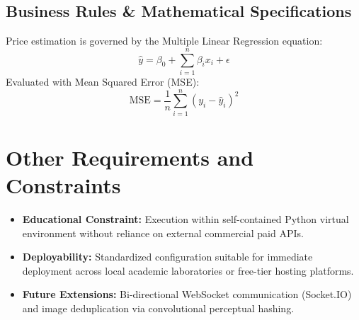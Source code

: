 \documentclass[11pt,a4paper]{article}
\begin{document}
\subsection{Business Rules \& Mathematical Specifications}
Price estimation is governed by the Multiple Linear Regression equation:
$$\hat{y} = \beta_0 + \sum_{i=1}^{n} \beta_i x_i + \epsilon$$
Evaluated with Mean Squared Error (MSE):
$$\text{MSE} = \frac{1}{n} \sum_{i=1}^{n} (y_i - \hat{y}_i)^2$$

\section{Other Requirements and Constraints}
\begin{itemize}[leftmargin=0.8cm]
    \item \textbf{Educational Constraint:} Execution within self-contained Python virtual environment without reliance on external commercial paid APIs.
    \item \textbf{Deployability:} Standardized configuration suitable for immediate deployment across local academic laboratories or free-tier hosting platforms.
    \item \textbf{Future Extensions:} Bi-directional WebSocket communication (Socket.IO) and image deduplication via convolutional perceptual hashing.
\end{itemize}
\end{document}
